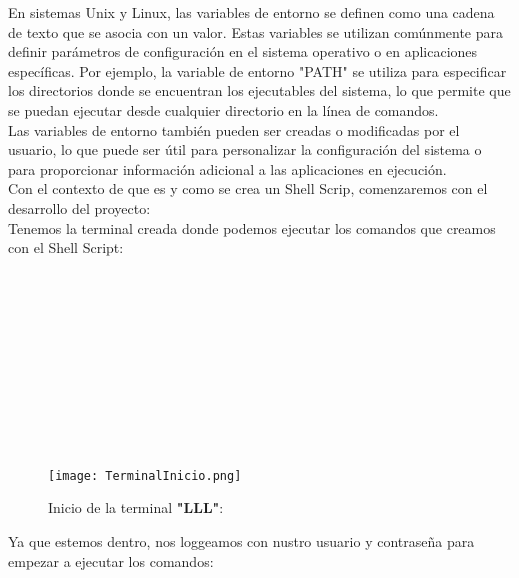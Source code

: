 \documentclass[titlepage]{article}
\begin{document}
En sistemas Unix y Linux, las variables de entorno se definen como una cadena de texto que se asocia con un valor. Estas variables se utilizan comúnmente para definir parámetros de configuración en el sistema operativo o en aplicaciones específicas. Por ejemplo, la variable de entorno "PATH" se utiliza para especificar los directorios donde se encuentran los ejecutables del sistema, lo que permite que se puedan ejecutar desde cualquier directorio en la línea de comandos.\\

Las variables de entorno también pueden ser creadas o modificadas por el usuario, lo que puede ser útil para personalizar la configuración del sistema o para proporcionar información adicional a las aplicaciones en ejecución.\\

Con el contexto de que es y como se crea un Shell Scrip, comenzaremos con el desarrollo del proyecto:\\

Tenemos la terminal creada donde podemos ejecutar los comandos que creamos con el Shell Script:\\\\\\\\\\\\\\\\\\\\\\

\begin{figure}[h]
    \centering
    \texttt{[image: TerminalInicio.png]}
    \caption{Inicio de la terminal \textbf{"LLL"}:}
    \label{fig:ejemplo}
\end{figure}

Ya que estemos dentro, nos loggeamos con nustro usuario y contraseña para empezar a ejecutar los comandos:\\\\\\\\\\\\\\\\\\\\\\\\
\end{document}
